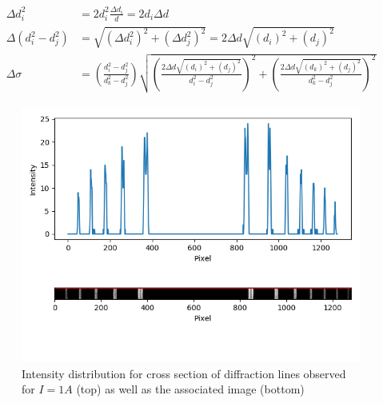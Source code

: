 \documentclass[11pt,a4paper]{article}
\begin{document}
      \begin{align}
         \begin{split}
           \Delta d_i^2 &= 2d_i^2\frac{\Delta d_i}{d} = 2d_i\Delta d \\
           \Delta (d_i^2 - d_j^2 ) &= \sqrt{(\Delta d_i^2)^2 + (\Delta d_j^2)^2} = 2\Delta d\sqrt{(d_i)^2 + (d_j)^2} \\
           \Delta \sigma &=
           \left(\frac{d_i^2 - d_j^2}{d_k^2 - d_j^2}\right) 
           \sqrt{ 
            \left(
            \frac{2\Delta d\sqrt{(d_i)^2 + (d_j)^2}}{d_i^2 - d_j^2}
            \right)^2 + 
            \left(
            \frac{2\Delta d\sqrt{(d_k)^2 + (d_j)^2}}{d_k^2 - d_j^2}
            \right)^2 
            }
         \end{split}
         \label{eqn:sigmaerr}
     \end{align} 



      \begin{figure}[H]
        \center
        \includegraphics[scale=0.8]{scripts/zeeman_1a_intensity.png}
        \caption{Intensity distribution for cross section of diffraction lines observed for $I=1A$ (top) as well as the associated image (bottom)}
        \label{fig:1A_intensity_dist}
      \end{figure}
\end{document}
